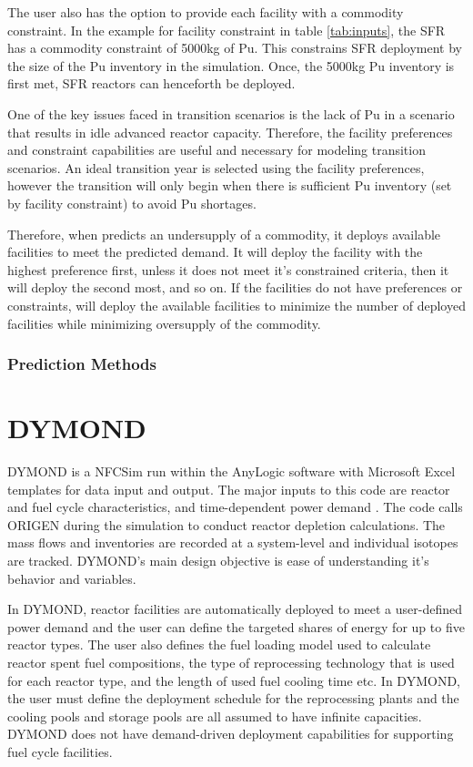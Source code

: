     The user also has the option to provide each facility with a 
    commodity constraint. 
    In the example for facility constraint in table \ref{tab:inputs}, 
    the \gls{SFR} has a commodity constraint of 5000kg of Pu. 
    This constrains \gls{SFR} deployment by the size of the Pu inventory 
    in the simulation. 
    Once, the 5000kg Pu inventory is first met, \gls{SFR} reactors can 
    henceforth be deployed. 
    
    One of the key issues faced in transition scenarios is the lack 
    of Pu in a scenario that results in idle advanced reactor capacity. 
    Therefore, the facility preferences and constraint capabilities 
    are useful and necessary for modeling transition scenarios. 
    An ideal transition year is selected using the facility 
    preferences, however the transition will only begin when there 
    is sufficient Pu inventory (set by facility constraint) 
    to avoid Pu shortages. 
    
    Therefore, when \deploy predicts an undersupply of a commodity, 
    it deploys available facilities to meet the predicted demand. 
    It will deploy the facility with the highest preference first, 
    unless it does not meet it's constrained criteria, then it will 
    deploy the second most, and so on. 
    If the facilities do not have preferences or constraints, \deploy 
    will deploy the available facilities to minimize the number of 
    deployed facilities while minimizing oversupply of the commodity.

\subsubsection{\textbf{Prediction Methods}}
\section{DYMOND}
DYMOND \cite{yacout_modeling_2005} is a \gls{NFCSim} run within 
the AnyLogic software with Microsoft Excel templates for 
data input and output. 
The major inputs to this code are reactor and fuel cycle 
characteristics, and time-dependent power demand 
\cite{feng_standardized_2016}.   
The code calls ORIGEN \cite{bell_origen_1973} during the simulation 
to conduct reactor depletion calculations. 
The mass flows and inventories are recorded at a system-level
and individual isotopes are tracked. 
DYMOND's main design objective is ease of understanding it's 
behavior and variables. 

In DYMOND, reactor facilities are automatically deployed to 
meet a user-defined power demand and the user can define 
the targeted shares of energy for up to five reactor types. 
The user also defines the fuel loading model used to calculate 
reactor spent fuel compositions, the type of reprocessing 
technology that is used for each reactor type, and the length 
of used fuel cooling time etc. 
In DYMOND, the user must define the deployment schedule for 
the reprocessing plants and the cooling pools and storage pools 
are all assumed to have infinite capacities. 
DYMOND does not have demand-driven deployment capabilities for 
supporting fuel cycle facilities. 

